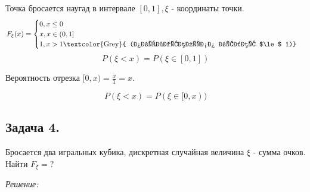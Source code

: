 Точка бросается наугад в интервале $[0,1], \xi$ - координаты точки.
\[ F_{\xi}(x) =
\begin{cases}
	0, x \le 0 \\
	x, x \in (0,1] \\
	1, x > 1 \text{\textcolor{Grey}{ (обязательно будет $\le$ 1)}}
\end{cases}
\]
\[ P(\xi < x) = P(\xi \in[0,1]) \]
\begin{figure}[H]
\end{figure}
Вероятность отрезка $[0,x) = \frac{x}{1} = x$.
\begin{figure}[H]
\end{figure}
\[ P(\xi < x) = P(\xi \in [0,x)) \]

\subsection*{Задача 4.}

Бросается два игральных кубика, дискретная случайная величина $\xi$ - сумма очков. Найти $F_{\xi} = ?$

\noindent \textit{Решение:}

